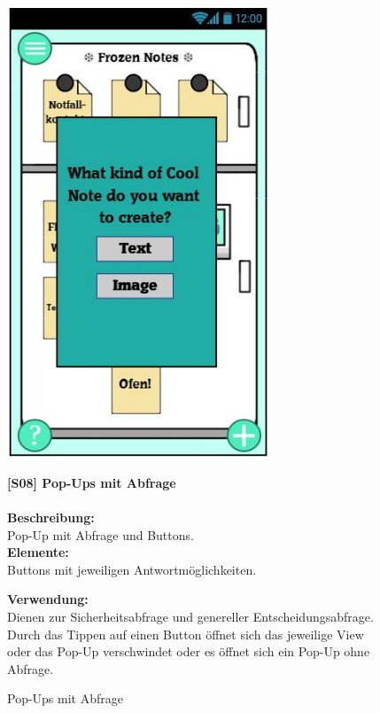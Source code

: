 \documentclass[a4paper]{scrreprt}
\begin{document}
    	\begin{figure}[h!]
    		\begin{minipage}[t]{0.4\linewidth}
    			\flushright
    			\centering
    			\vspace{9mm}
    			\includegraphics[width=0.7\textwidth]{fridget_type.JPG}
    			\caption{Pop-Ups mit Abfrage}
    			\label{fig:figure1}
    		\end{minipage}
    		\hspace{0.5cm}
    		\begin{minipage}[t]{0.55\linewidth}
    			\flushleft
    			\vspace{9mm}
    			\textbf{{[}S08{]} Pop-Ups mit Abfrage} \\
    			\hfill
    			\\
    			\textbf{Beschreibung:} \\
    			Pop-Up mit Abfrage und Buttons. 
    			\\
    			\textbf{Elemente:}\\
    			Buttons mit jeweiligen Antwortmöglichkeiten.\\
    			
    			\hfill 
    			
    			\textbf{Verwendung:}\\
    			 Dienen zur Sicherheitsabfrage und genereller 
    			Entscheidungsabfrage.\\ Durch das Tippen auf
    			einen Button öffnet sich das jeweilige View oder
    			das Pop-Up verschwindet oder es öffnet sich ein
    			Pop-Up ohne Abfrage.
    			 
    			
    			
    			
    		\end{minipage}
    	\end{figure}
    	
\end{document}

